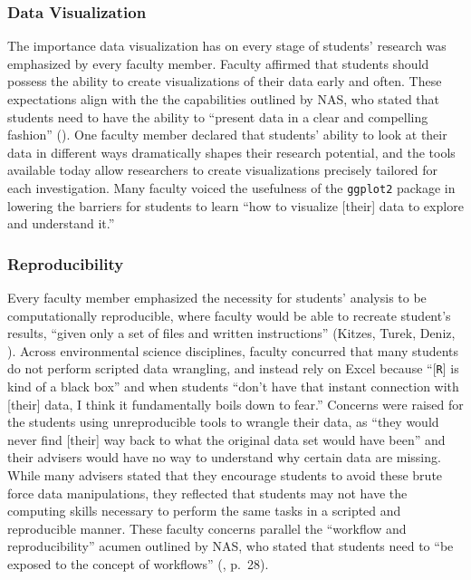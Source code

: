 \documentclass[12pt]{article}
\newcommand{\stacey}[1]{{\color{purple}[[\textbf{Stacey says: }#1]]}}
\begin{document}
\subsubsection{Data Visualization} 

\noindent The importance data visualization has on every stage of students'
research was emphasized by every faculty member. Faculty affirmed
that students should possess the ability to create visualizations of their data
early and often. These expectations align with the the capabilities outlined by
NAS, who stated that students need to have the ability to ``present data in a
clear and compelling fashion'' (\citeyear[p.\ 26]{nas}). One faculty member
declared that students' ability to look at their data in different ways
dramatically shapes their research potential, and the tools available today
allow researchers to create visualizations precisely tailored for each
investigation. Many faculty voiced the usefulness of the \texttt{ggplot2} 
package \citep{ggplot} in lowering the barriers for students to learn ``how to
visualize [their] data to explore and understand it.'' 

\subsubsection{Reproducibility}  


\noindent Every faculty member emphasized the necessity for students' analysis to 
be computationally reproducible, where faculty would be able to recreate 
student's results, ``given only a set of files and written instructions''
(Kitzes, Turek, Deniz, \citeyear{reproducible}). Across environmental science
disciplines, faculty concurred that many students do not perform scripted data
wrangling, and instead rely on Excel because ``[\texttt{R}] is kind of a black
box'' and when students ``don't have that instant connection with [their] data,
I think it fundamentally boils down to fear.'' Concerns were raised for the
students using unreproducible tools to wrangle their data, as ``they would never
find [their] way back to what the original data set would have been'' and their
advisers would have no way to understand why certain data are missing. While
many advisers stated that they encourage students to avoid these brute force
data manipulations, they reflected that students may not have the computing
skills necessary to perform the same tasks in a scripted and reproducible
manner. These faculty concerns parallel the ``workflow and reproducibility''
acumen outlined by NAS, who stated that students need to ``be exposed to the
concept of workflows'' (\citeyear{nas}, p.\ 28). 
\end{document}
